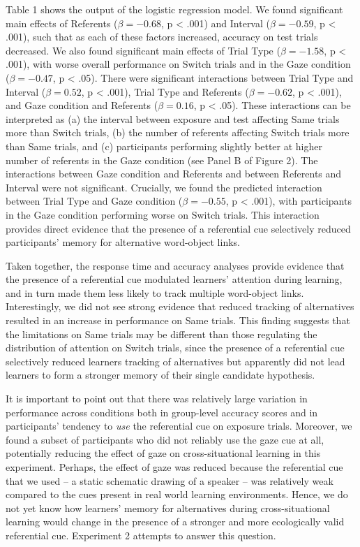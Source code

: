 \documentclass[a4paper,man,natbib]{apa6}
\begin{document}
Table 1 shows the output of the logistic regression model. We found
significant main effects of Referents (\(\beta = -0.68\), p \textless{}
.001) and Interval (\(\beta = -0.59\), p \textless{} .001), such that as
each of these factors increased, accuracy on test trials decreased. We
also found significant main effects of Trial Type (\(\beta = -1.58\), p
\textless{} .001), with worse overall performance on Switch trials and
in the Gaze condition (\(\beta = -0.47\), p \textless{} .05). There were
significant interactions between Trial Type and Interval
(\(\beta = 0.52\), p \textless{} .001), Trial Type and Referents
(\(\beta = -0.62\), p \textless{} .001), and Gaze condition and
Referents (\(\beta = 0.16\), p \textless{} .05). These interactions can
be interpreted as (a) the interval between exposure and test affecting
Same trials more than Switch trials, (b) the number of referents
affecting Switch trials more than Same trials, and (c) participants
performing slightly better at higher number of referents in the Gaze
condition (see Panel B of Figure 2). The interactions between Gaze
condition and Referents and between Referents and Interval were not
significant. Crucially, we found the predicted interaction between Trial
Type and Gaze condition (\(\beta = -0.55\), p \textless{} .001), with
participants in the Gaze condition performing worse on Switch trials.
This interaction provides direct evidence that the presence of a
referential cue selectively reduced participants' memory for alternative
word-object links.

Taken together, the response time and accuracy analyses provide evidence
that the presence of a referential cue modulated learners' attention
during learning, and in turn made them less likely to track multiple
word-object links. Interestingly, we did not see strong evidence that
reduced tracking of alternatives resulted in an increase in performance
on Same trials. This finding suggests that the limitations on Same
trials may be different than those regulating the distribution of
attention on Switch trials, since the presence of a referential cue
selectively reduced learners tracking of alternatives but apparently did
not lead learners to form a stronger memory of their single candidate
hypothesis.

It is important to point out that there was relatively large variation
in performance across conditions both in group-level accuracy scores and
in participants' tendency to \emph{use} the referential cue on exposure
trials. Moreover, we found a subset of participants who did not reliably
use the gaze cue at all, potentially reducing the effect of gaze on
cross-situational learning in this experiment. Perhaps, the effect of
gaze was reduced because the referential cue that we used -- a static
schematic drawing of a speaker -- was relatively weak compared to the
cues present in real world learning environments. Hence, we do not yet
know how learners' memory for alternatives during cross-situational
learning would change in the presence of a stronger and more
ecologically valid referential cue. Experiment 2 attempts to answer this
question.
\end{document}
